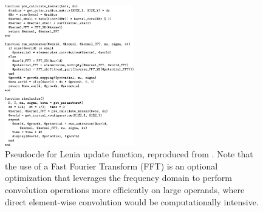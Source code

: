 \begin{figure}
\centering
\includegraphics[width=0.5\textwidth]{img/lenia-pseudocode}
\caption{Pseudocde for Lenia update function, reproduced from \citep{chan2019lenia}.
Note that the use of a Fast Fourier Transform (FFT) is an optional optimization that leverages the frequency domain to perform convolution operations more efficiently on large operands, where direct element-wise convolution would be computationally intensive.
}
\label{fig:lenia-event-types}
\end{figure}
